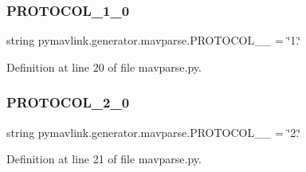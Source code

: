 \subsubsection{\texorpdfstring{PROTOCOL\_1\_0}{PROTOCOL\_1\_0}}
{\footnotesize\ttfamily string pymavlink.\+generator.\+mavparse.\+P\+R\+O\+T\+O\+C\+O\+L\+\_\+\_ = \char`\"{}1.\char`\"{}}



Definition at line 20 of file mavparse.\+py.

\mbox{\label{namespacepymavlink_1_1generator_1_1mavparse_a87817b2175b76fab09524650d04cd139}} 
\subsubsection{\texorpdfstring{PROTOCOL\_2\_0}{PROTOCOL\_2\_0}}
{\footnotesize\ttfamily string pymavlink.\+generator.\+mavparse.\+P\+R\+O\+T\+O\+C\+O\+L\+\_\+\_ = \char`\"{}2.\char`\"{}}



Definition at line 21 of file mavparse.\+py.

